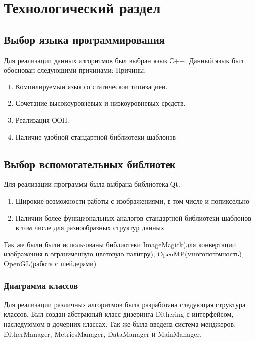 \chapter{Технологический раздел}
\section{Выбор  языка программирования}
Для реализации данных алгоритмов был выбран язык  С++. Данный язык был обоснован следующими причинами:
Причины:
\begin{enumerate}
	 \item Компилируемый язык со статической типизацией. 
	 \item Сочетание высокоуровневых и низкоуровневых средств.
	 \item Реализация ООП.
	 \item Наличие удобной стандартной библиотеки шаблонов
	 \end{enumerate}
\section{Выбор вспомогательных библиотек}
Для реализации программы была выбрана библиотека Qt.
\begin{enumerate}
	\item Широкие возможности работы с изображениями, в том числе и попиксельно
	\item Наличии более функциональных аналогов стандартной библиотеки шаблонов в том числе для разнообразных структур данных
\end{enumerate}
Так же были были использованы библиотеки ImageMagick(для конвертации изображения в ограниченную цветовую палитру), OpenMP(многопоточность), OpenGL(работа с шейдерами)
\subsection{Диаграмма классов}
Для реализации различных алгоритмов была разработана следующая структура классов. Был создан абстракный класс дизеринга Dithering с интерфейсом, наследуюмом в дочерних классах. Так же была введена система менджеров: DitherManager, MetricsManager, DataManager и MainManager.


